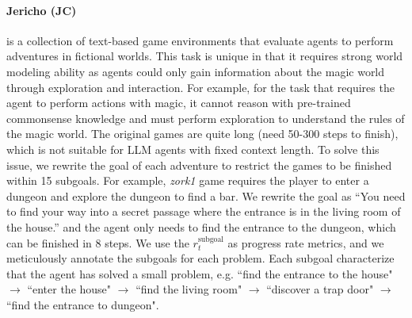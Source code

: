 \paragraph{Jericho (JC)~\citep{hausknecht2020interactive}}
is a collection of text-based game environments that evaluate agents to perform adventures in fictional worlds. This task is unique in that it requires strong world modeling ability as agents could only gain information about the magic world through exploration and interaction. 
For example, for the task that requires the agent to perform actions with magic, it cannot reason with pre-trained commonsense knowledge and must perform exploration to understand the rules of the magic world. 
The original games are quite long (need 50-300 steps to finish), which is not suitable for LLM agents with fixed context length. To solve this issue, we rewrite the goal of each adventure to restrict the games to be finished within 15 subgoals. 
For example, \emph{zork1} game requires the player to enter a dungeon and explore the dungeon to find a bar. We rewrite the goal as “You need to find your way into a secret passage where the entrance is in the living room of the house.” and the agent only needs to find the entrance to the dungeon, which can be finished in 8 steps. 
We use the $r_t^{\text{subgoal}}$ as progress rate metrics, and we meticulously annotate the subgoals for each problem. 
Each subgoal characterize that the agent has solved a small problem, e.g. “find the entrance to the house" $\rightarrow$ “enter the house" $\rightarrow$ “find the living room" $\rightarrow$ “discover a trap door" $\rightarrow$ “find the entrance to dungeon". 

